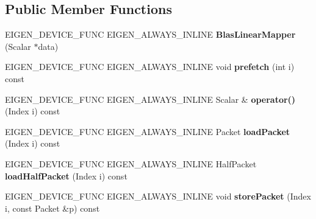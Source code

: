 \subsection*{Public Member Functions}
\begin{DoxyCompactItemize}
\item 
\mbox{\label{class_eigen_1_1internal_1_1_blas_linear_mapper_a7f663c011737427cae88044cc69b4918}} 
E\+I\+G\+E\+N\+\_\+\+D\+E\+V\+I\+C\+E\+\_\+\+F\+U\+NC E\+I\+G\+E\+N\+\_\+\+A\+L\+W\+A\+Y\+S\+\_\+\+I\+N\+L\+I\+NE {\bfseries Blas\+Linear\+Mapper} (Scalar $\ast$data)
\item 
\mbox{\label{class_eigen_1_1internal_1_1_blas_linear_mapper_ad17cc10aa0e1557737199bed14a1b784}} 
E\+I\+G\+E\+N\+\_\+\+D\+E\+V\+I\+C\+E\+\_\+\+F\+U\+NC E\+I\+G\+E\+N\+\_\+\+A\+L\+W\+A\+Y\+S\+\_\+\+I\+N\+L\+I\+NE void {\bfseries prefetch} (int i) const
\item 
\mbox{\label{class_eigen_1_1internal_1_1_blas_linear_mapper_a0b6a635dc05553ee31bde3a7c4527706}} 
E\+I\+G\+E\+N\+\_\+\+D\+E\+V\+I\+C\+E\+\_\+\+F\+U\+NC E\+I\+G\+E\+N\+\_\+\+A\+L\+W\+A\+Y\+S\+\_\+\+I\+N\+L\+I\+NE Scalar \& {\bfseries operator()} (Index i) const
\item 
\mbox{\label{class_eigen_1_1internal_1_1_blas_linear_mapper_a42eaa16ed738ea667a2d5f69fc6f5985}} 
E\+I\+G\+E\+N\+\_\+\+D\+E\+V\+I\+C\+E\+\_\+\+F\+U\+NC E\+I\+G\+E\+N\+\_\+\+A\+L\+W\+A\+Y\+S\+\_\+\+I\+N\+L\+I\+NE Packet {\bfseries load\+Packet} (Index i) const
\item 
\mbox{\label{class_eigen_1_1internal_1_1_blas_linear_mapper_ad0b309a443fe66f1a6c96ecc7e7d209e}} 
E\+I\+G\+E\+N\+\_\+\+D\+E\+V\+I\+C\+E\+\_\+\+F\+U\+NC E\+I\+G\+E\+N\+\_\+\+A\+L\+W\+A\+Y\+S\+\_\+\+I\+N\+L\+I\+NE Half\+Packet {\bfseries load\+Half\+Packet} (Index i) const
\item 
\mbox{\label{class_eigen_1_1internal_1_1_blas_linear_mapper_abe3c1c4047295e21b64e4f8bb13ddea5}} 
E\+I\+G\+E\+N\+\_\+\+D\+E\+V\+I\+C\+E\+\_\+\+F\+U\+NC E\+I\+G\+E\+N\+\_\+\+A\+L\+W\+A\+Y\+S\+\_\+\+I\+N\+L\+I\+NE void {\bfseries store\+Packet} (Index i, const Packet \&p) const
\end{DoxyCompactItemize}
